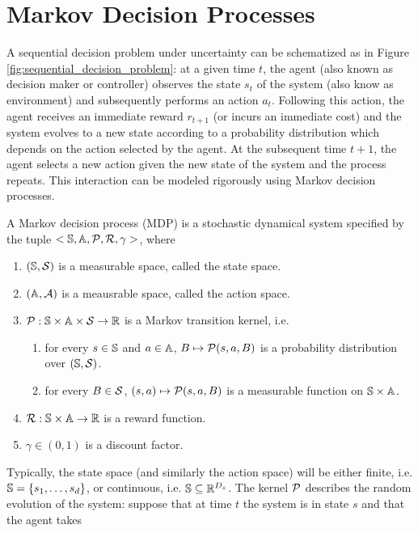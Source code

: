 \section{Markov Decision Processes}
A sequential decision problem under uncertainty can be schematized as in Figure
\ref{fig:sequential_decision_problem}: at a given time $t$, the agent (also
known as decision maker or controller) observes the state $s_t$ of the system 
(also know as environment) and subsequently performs an action $a_t$. Following
this action, the agent receives an immediate reward $r_{t+1}$ (or incurs an
immediate cost) and the system evolves to a new state according to a probability
distribution which depends on the action selected by the agent. At the
subsequent time $t+1$, the agent selects a new action given the new state of
the system and the process repeats. This interaction can be modeled rigorously
using Markov decision processes.  
\begin{definition}
	A Markov decision process (MDP) is a stochastic dynamical system specified by the tuple $<\S, \A, \calP, \calR,
	\gamma>$, where
	\begin{enumerate}[label={\roman*)}]
		\item $(\S, \calS)$ is a measurable space, called the state space.
		\item $(\A, \calA)$ is a meausrable space, called the action space. 
		\item $\calP: \S \times \A \times \calS \to \R$ is a Markov transition
			kernel, i.e.
			\begin{enumerate}[label={\alph*)}]
				\item for every $s\in\S$ and $a\in\A$, $B \mapsto \calP(s,a,B)$
					  is a probability distribution over $(\S, \calS)$.
				\item for every $B\in\calS$, $(s,a) \mapsto \calP(s,a,B)$ is
					  a measurable function on $\S \times \A$.
			\end{enumerate}
		\item $\calR: \S \times \A \to \R$ is a reward function.
		\item $\gamma \in (0,1)$ is a discount factor.
	\end{enumerate}
\end{definition}
Typically, the state space (and similarly the action space) will be either
finite, i.e. $\S = \{s_1, \ldots, s_d\}$, or continuous, i.e. $\S \subseteq
\R^{D_s}$. The kernel $\calP$ describes the random evolution of the system:
suppose that at time $t$ the system is in state $s$ and that the agent takes
